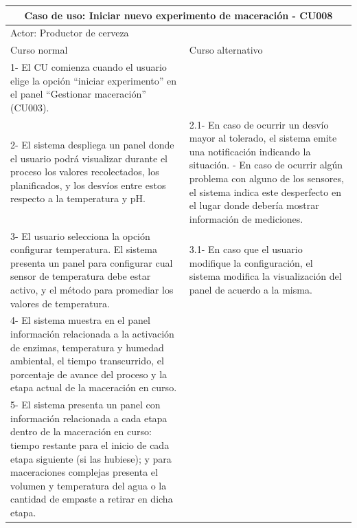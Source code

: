 \begin{longtable}{|p{7cm}|p{7cm}|}
        \multicolumn{2}{|c|}{\textbf{Caso de uso: Iniciar nuevo experimento de maceración - CU008}} \\
        \hline
        \multicolumn{2}{|l|}{Actor: Productor de cerveza} \\
        \hline
        Curso normal & Curso alternativo \\
        \hline
        1- El CU comienza cuando el usuario elige la opción ``iniciar experimento'' en el panel ``Gestionar maceración'' (CU003). & \\
        \hline
        2- El sistema despliega un panel donde el usuario podrá visualizar durante el proceso los valores recolectados, los planificados, y los desvíos entre estos respecto a la temperatura y pH. & 2.1- En caso de ocurrir un desvío mayor al tolerado, el sistema emite una notificación indicando la situación. \newline 2.2- En caso de ocurrir algún problema con alguno de los sensores, el sistema indica este desperfecto en el lugar donde debería mostrar información de mediciones.
        \\
        \hline
        3- El usuario selecciona la opción configurar temperatura. El sistema presenta un panel para configurar cual  sensor de temperatura debe estar activo, y el método para promediar los valores de temperatura. &3.1- En caso que el usuario modifique la configuración, el sistema modifica la visualización del panel de acuerdo a la misma.\\ 
        \hline
        
        4- El sistema muestra en el panel información relacionada a la activación de enzimas, temperatura y humedad ambiental, el tiempo transcurrido, el porcentaje de avance del proceso y la etapa actual de la maceración en curso.& \\
        \hline
        
        5- El sistema presenta un panel con información relacionada a cada etapa dentro de la maceración en curso: tiempo restante para el inicio de cada etapa siguiente (si las hubiese); y para maceraciones complejas presenta el volumen y temperatura del agua o la cantidad de empaste a retirar en dicha etapa. & \\
        \hline
        

\end{longtable}
